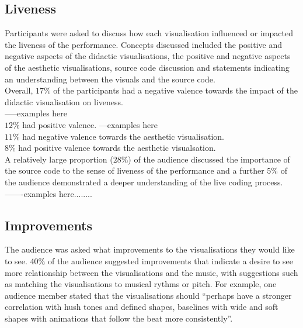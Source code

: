 \documentclass[12pt]{article}
\begin{document}
\subsection{Liveness}

Participants were asked to discuss how each visualisation influenced or impacted the liveness of the performance. Concepts discussed included the positive and negative aspects of the didactic visualisations, the positive and negative aspects of the aesthetic visualisations, source code discussion and statements indicating an understanding between the visuals and the source code.\\

Overall, $17\%$ of the participants had a negative valence towards the impact of the didactic visualisation on liveness.\\

-----examples here\\

$12\%$ had positive valence. ---examples here\\

$11\%$ had negative valence towards the aesthetic visualisation.\\

$8\%$ had positive valence towards the aesthetic visualsation.\\

A relatively large proportion ($28\%$) of the audience discussed the importance of the source code to the sense of liveness of the performance and a further $5\%$ of the audience demonstrated a deeper understanding of the live coding process. -------examples here........\\

\subsection{Improvements}

The audience was asked what improvements to the visualisations they would like to see. 40\% of the audience suggested improvements that indicate a desire to see more relationship between the visualisations and the music, with suggestions such as matching the visualisations to musical rythms or pitch. For example, one audience member stated that the visualisations should ``perhaps have a stronger correlation with hush tones and defined shapes, baselines with wide and soft shapes with animations that follow the beat more consistently''.\\
\end{document}
